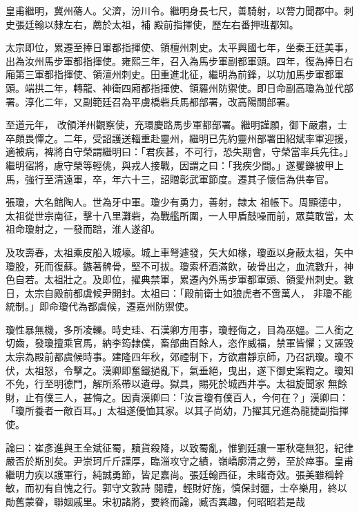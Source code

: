 \begin{pinyinscope}
 皇甫繼明，冀州蓨人。父濟，汾川令。繼明身長七尺，善騎射，以膂力聞郡中。刺史張廷翰以隸左右，薦於太祖，補
 殿前指揮使，歷左右番押班都知。



 太宗即位，累遷至捧日軍都指揮使、領檀州刺史。太平興國七年，坐秦王廷美事，出為汝州馬步軍都指揮使。雍熙三年，召入為馬步軍副都軍頭。四年，復為捧日右廂第三軍都指揮使、領澶州刺史。田重進北征，繼明為前鋒，以功加馬步軍都軍頭。端拱二年，轉龍、神衛四廂都指揮使、領羅州防禦使。即日命副高瓊為並代部署。淳化二年，又副範廷召為平虜橋砦兵馬都部署，改高陽關部署。



 至道元年，
 改領洋州觀察使，充環慶路馬步軍都部署。繼明謹願，御下嚴肅，士卒頗畏憚之。二年，受詔護送輜重赴靈州，繼明已先約靈州部署田紹斌率軍迎援，適被病，裨將白守榮謂繼明曰：「君疾甚，不可行，恐失期會，守榮當率兵先往。」繼明宿將，慮守榮等輕佻，與戎人接戰，因謂之曰：「我疾少間。」遂矍鑠被甲上馬，強行至清遠軍，卒，年六十三，詔贈彰武軍節度。遷其子懷信為供奉官。



 張瓊，大名館陶人。世為牙中軍。瓊少有勇力，善射，隸太
 祖帳下。周顯德中，太祖從世宗南征，擊十八里灘砦，為戰艦所圍，一人甲盾鼓噪而前，眾莫敢當，太祖命瓊射之，一發而踣，淮人遂卻。



 及攻壽春，太祖乘皮船入城壕。城上車弩遽發，矢大如椽，瓊亟以身蔽太祖，矢中瓊股，死而復蘇。鏃著髀骨，堅不可拔。瓊索杯酒滿飲，破骨出之，血流數升，神色自若。太祖壯之。及即位，擢典禁軍，累遷內外馬步軍都軍頭、領愛州刺史。數日，太宗自殿前都虞候尹開封。太祖曰：「殿前衛士如狼虎者不啻萬人，
 非瓊不能統制。」即命瓊代為都虞候，遷嘉州防禦使。



 瓊性暴無機，多所凌轢。時史珪、石漢卿方用事，瓊輕侮之，目為巫媼。二人銜之切齒，發瓊擅乘官馬，納李筠隸僕，畜部曲百餘人，恣作威福，禁軍皆懼；又誣毀太宗為殿前都虞候時事。建隆四年秋，郊禋制下，方欲肅靜京師，乃召訊瓊。瓊不伏，太祖怒，令擊之。漢卿即奮鐵撾亂下，氣垂絕，曳出，遂下御史案鞫之。瓊知不免，行至明德門，解所系帶以遺母。獄具，賜死於城西井亭。太祖旋聞家
 無餘財，止有僕三人，甚悔之。因責漢卿曰：「汝言瓊有僕百人，今何在？」漢卿曰：「瓊所養者一敵百耳。」太祖遂優恤其家。以其子尚幼，乃擢其兄進為龍捷副指揮使。



 論曰：崔彥進與王全斌征蜀，黷貨殺降，以致蜀亂，惟劉廷讓一軍秋毫無犯，紀律嚴否於斯別矣。尹崇珂斤斤謹厚，臨淄攻守之績，嶺嶠廓清之勞，至於瘁事。皇甫繼明力疾以護軍行，純誠勇節，皆足嘉尚。張廷翰西征，未睹奇效。張美雖稱幹敏，而初有自愧之行。郭守文敦詩
 閱禮，輕財好施，慎保封疆，士卒樂用，終以勛舊蒙眷，聯姻戚里。宋初諸將，要終而論，臧否異趣，何昭昭若是哉



\end{pinyinscope}